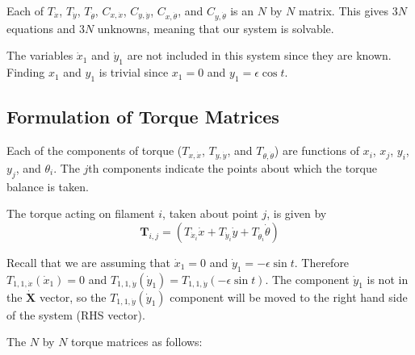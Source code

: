 \documentclass[12pt,letterpaper,titlepage]{article}
\begin{document}
Each of $T_{\dot{x}}$, $T_{\dot{y}}$, $T_{\dot{\theta}}$, $C_{x,\dot{x}}$, $C_{y,\dot{y}}$, $C_{x,\dot{\theta}}$, and $C_{y,\dot{\theta}}$ is an $N$ by $N$ matrix. This gives $3N$ equations and $3N$ unknowns, meaning that our system is solvable.

The variables $\dot{x}_1$ and $\dot{y}_1$ are not included in this system since they are known. Finding $x_1$ and $y_1$ is trivial since $x_1 = 0$ and $y_1 = \epsilon \cos t$.

\newpage
\subsection{Formulation of Torque Matrices}
Each of the components of torque ($T_{x,\dot{x}}$, $T_{y,\dot{y}}$, and $T_{\theta,\dot{\theta}}$) are functions of $x_i$, $x_j$, $y_i$, $y_j$, and $\theta_i$. The $j$th components indicate the points about which the torque balance is taken.

The torque acting on filament $i$, taken about point $j$, is given by
\begin{equation}
\mathbf{T}_{i,j} = (T_{\dot{x}_i}\dot{x}+T_{\dot{y}_i}\dot{y}+T_{\dot{\theta}_i}\dot{\theta})
\end{equation}

Recall that we are assuming that $\dot{x}_1 = 0$ and $\dot{y}_1 = -\epsilon \sin t$. Therefore  $T_{1,1,\dot{x}} (\dot{x}_1) = 0$ and $T_{1,1,\dot{y}} (\dot{y}_1) = T_{1,1,\dot{y}}(-\epsilon \sin t)$. The component $\dot{y}_1$ is not in the $\mathbf{\dot{X}}$ vector, so the $T_{1,1,\dot{y}} (\dot{y}_1)$ component will be moved to the right hand side of the system (RHS vector).

The $N$ by $N$ torque matrices as follows:
\end{document}
